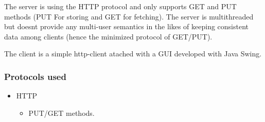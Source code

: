 \documentclass[a4paper, 11pt]{article}
\begin{document}
The server is using the HTTP protocol and only supports GET and PUT methods (PUT For storing and GET for fetching). The server is multithreaded but doesnt provide any multi-user semantics in the likes of keeping consistent data among clients (hence the minimized protocol of GET/PUT).

The client is a simple http-client atached with a GUI developed with Java Swing.
\subsubsection{Protocols used}
\begin{itemize}
\item HTTP 
  \begin{itemize}
  \item PUT/GET methods.
  \end{itemize}
\end{itemize}
\end{document}
